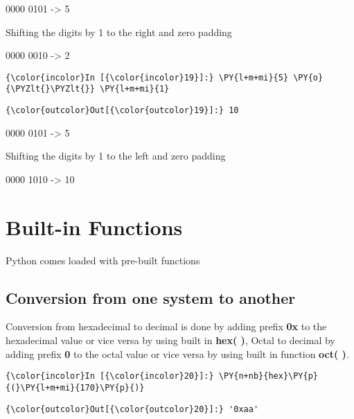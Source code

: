     0000 0101 -\textgreater{} 5

Shifting the digits by 1 to the right and zero padding

0000 0010 -\textgreater{} 2

    \begin{Verbatim}[commandchars=\\\{\}]
{\color{incolor}In [{\color{incolor}19}]:} \PY{l+m+mi}{5} \PY{o}{\PYZlt{}\PYZlt{}} \PY{l+m+mi}{1}
\end{Verbatim}

            \begin{Verbatim}[commandchars=\\\{\}]
{\color{outcolor}Out[{\color{outcolor}19}]:} 10
\end{Verbatim}
        
    0000 0101 -\textgreater{} 5

Shifting the digits by 1 to the left and zero padding

0000 1010 -\textgreater{} 10

    \section{Built-in Functions}\label{built-in-functions}

    Python comes loaded with pre-built functions

    \subsection{Conversion from one system to
another}\label{conversion-from-one-system-to-another}

    Conversion from hexadecimal to decimal is done by adding prefix
\textbf{0x} to the hexadecimal value or vice versa by using built in
\textbf{hex( )}, Octal to decimal by adding prefix \textbf{0} to the
octal value or vice versa by using built in function \textbf{oct( )}.

    \begin{Verbatim}[commandchars=\\\{\}]
{\color{incolor}In [{\color{incolor}20}]:} \PY{n+nb}{hex}\PY{p}{(}\PY{l+m+mi}{170}\PY{p}{)}
\end{Verbatim}

            \begin{Verbatim}[commandchars=\\\{\}]
{\color{outcolor}Out[{\color{outcolor}20}]:} '0xaa'
\end{Verbatim}
        
